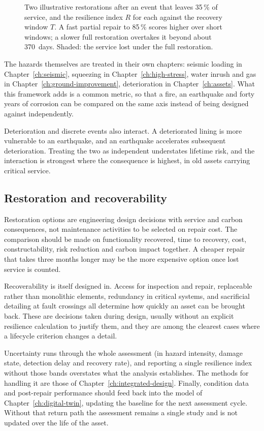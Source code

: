 \begin{figure}[htbp]
\centering
{}
\caption{Two illustrative restorations after an event that leaves 35\,\% of
service, and the resilience index $R$ for each against the recovery window
$T$. A fast partial repair to 85\,\% scores higher over short windows; a
slower full restoration overtakes it beyond about 370~days. Shaded: the
service lost under the full restoration.}
\label{fig:sus-functionality}
\end{figure}

The hazards themselves are treated in their own chapters: seismic loading
in Chapter~\ref{ch:seismic}, squeezing in Chapter~\ref{ch:high-stress}, water inrush and gas in
Chapter~\ref{ch:ground-improvement}, deterioration in
Chapter~\ref{ch:assets}. What this framework adds is a common metric,
so that a fire, an earthquake and forty years of corrosion can be compared on
the same axis instead of being designed against independently.

Deterioration and discrete events also interact. A deteriorated lining is more
vulnerable to an earthquake, and an earthquake accelerates subsequent
deterioration. Treating the two as independent understates lifetime risk, and
the interaction is strongest where the consequence is highest, in
old assets carrying critical service.

\subsection{Restoration and recoverability}
\label{sec:restoration}

Restoration options are engineering design decisions with service and carbon
consequences, not maintenance activities to be selected on repair cost. The
comparison should be made on functionality recovered, time to recovery, cost,
constructability, risk reduction and carbon impact together. A cheaper repair
that takes three months longer may be the more expensive option once lost
service is counted.

Recoverability is itself designed in. Access for inspection and repair,
replaceable rather than monolithic elements, redundancy in critical systems,
and sacrificial detailing at fault crossings all determine how quickly an
asset can be brought back. These are decisions taken during design, usually
without an explicit resilience calculation to justify them, and they are among
the clearest cases where a lifecycle criterion changes a detail.

Uncertainty runs through the whole assessment (in hazard intensity, damage
state, detection delay and recovery rate), and reporting a single resilience
index without those bands overstates what the analysis establishes. The
methods for handling it are those of
Chapter~\ref{ch:integrated-design}. Finally, condition data and post-repair
performance should feed back into the model of
Chapter~\ref{ch:digital-twin}, updating the baseline for the next assessment
cycle. Without that return path the assessment remains a single study and is
not updated over the life of the asset.

\chapterreferences
